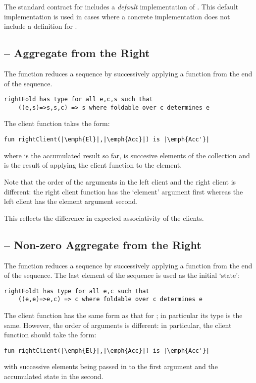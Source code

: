 \begin{aside}
The standard contract for  includes a \emph{default} implementation of . This default implementation is used in cases where a concrete implementation does not include a definition for .
\end{aside}

\subsection{ -- Aggregate from the Right}
\label{rightFold}
The  function reduces a sequence by successively applying a function from the end of the sequence.
\begin{lstlisting}
rightFold has type for all e,c,s such that
    ((e,s)=>s,s,c) => s where foldable over c determines e
\end{lstlisting}
The client function takes the form:
\begin{lstlisting}[escapechar=|]
fun rightClient(|\emph{El}|,|\emph{Acc}|) is |\emph{Acc'}|
\end{lstlisting}
where  is the accumulated result so far,  is succesive elements of the collection and  is the result of applying the client function to the element.

\begin{aside}
Note that the order of the arguments in the left client and the right client is different: the right client function has the `element' argument first whereas the left client has the element argument second.

This reflects the difference in expected associativity of the clients.
\end{aside}

\subsection{ -- Non-zero Aggregate from the Right}
\label{rightFold1}
The  function reduces a sequence by successively applying a function from the end of the sequence. The last element of the sequence is used as the initial `state':
\begin{lstlisting}
rightFold1 has type for all e,c such that
    ((e,e)=>e,c) => c where foldable over c determines e
\end{lstlisting}

\begin{aside}
The client function has the same form as that for ; in particular its type is the same. However, the order of arguments is different: in particular, the client function should take the form:
\begin{lstlisting}[escapechar=|]
fun rightClient(|\emph{El}|,|\emph{Acc}|) is |\emph{Acc'}|
\end{lstlisting}
with successive elements being passed in to the first argument and the accumulated state in the second.
\end{aside}

